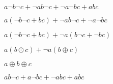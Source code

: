 
$a \neg b \neg c + \neg a b \neg c + \neg a \neg b c + a b c$

$a (\neg b\neg c+bc) + \neg a b \neg c + \neg a \neg b c$

$a (\neg b\neg c+bc) + \neg a (b \neg c + \neg b c)$

$a (b \odot c) + \neg a (b \oplus c)$


$a \oplus b \oplus c$


$ a b \neg c + a \neg b c + \neg a b c + a b c $

